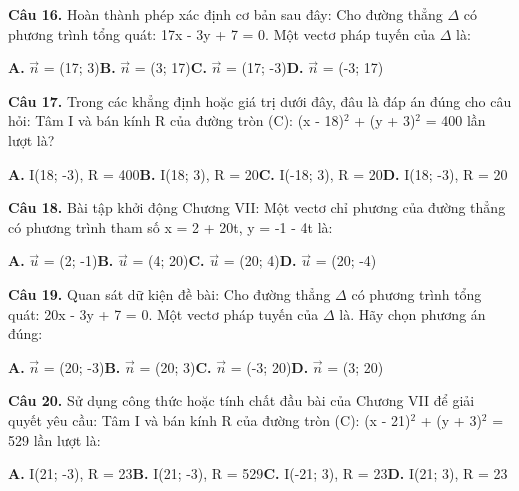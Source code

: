 \documentclass[11pt,a4paper]{article}
\begin{document}
\textbf{\color{primary} Câu 16.} Hoàn thành phép xác định cơ bản sau đây: Cho đường thẳng $\Delta$ có phương trình tổng quát: 17x - 3y + 7 = 0. Một vectơ pháp tuyến của $\Delta$ là:\par
\hspace*{1.5em}\textbf{A.} $\vec{n}$ = (17; 3)\quad\quad \textbf{B.} $\vec{n}$ = (3; 17)\quad\quad \textbf{C.} $\vec{n}$ = (17; -3)\quad\quad \textbf{D.} $\vec{n}$ = (-3; 17)\par\vspace{2pt}
\textbf{\color{primary} Câu 17.} Trong các khẳng định hoặc giá trị dưới đây, đâu là đáp án đúng cho câu hỏi: Tâm I và bán kính R của đường tròn (C): (x - 18)$^2$ + (y + 3)$^2$ = 400 lần lượt là?\par
\hspace*{1.5em}\textbf{A.} I(18; -3), R = 400\quad\quad \textbf{B.} I(18; 3), R = 20\quad\quad \textbf{C.} I(-18; 3), R = 20\quad\quad \textbf{D.} I(18; -3), R = 20\par\vspace{2pt}
\textbf{\color{primary} Câu 18.} Bài tập khởi động Chương VII: Một vectơ chỉ phương của đường thẳng có phương trình tham số x = 2 + 20t, y = -1 - 4t là:\par
\hspace*{1.5em}\textbf{A.} $\vec{u}$ = (2; -1)\quad\quad \textbf{B.} $\vec{u}$ = (4; 20)\quad\quad \textbf{C.} $\vec{u}$ = (20; 4)\quad\quad \textbf{D.} $\vec{u}$ = (20; -4)\par\vspace{2pt}
\textbf{\color{primary} Câu 19.} Quan sát dữ kiện đề bài: Cho đường thẳng $\Delta$ có phương trình tổng quát: 20x - 3y + 7 = 0. Một vectơ pháp tuyến của $\Delta$ là. Hãy chọn phương án đúng:\par
\hspace*{1.5em}\textbf{A.} $\vec{n}$ = (20; -3)\quad\quad \textbf{B.} $\vec{n}$ = (20; 3)\quad\quad \textbf{C.} $\vec{n}$ = (-3; 20)\quad\quad \textbf{D.} $\vec{n}$ = (3; 20)\par\vspace{2pt}
\textbf{\color{primary} Câu 20.} Sử dụng công thức hoặc tính chất đầu bài của Chương VII để giải quyết yêu cầu: Tâm I và bán kính R của đường tròn (C): (x - 21)$^2$ + (y + 3)$^2$ = 529 lần lượt là:\par
\hspace*{1.5em}\textbf{A.} I(21; -3), R = 23\quad\quad \textbf{B.} I(21; -3), R = 529\quad\quad \textbf{C.} I(-21; 3), R = 23\quad\quad \textbf{D.} I(21; 3), R = 23\par\vspace{2pt}
\end{document}
